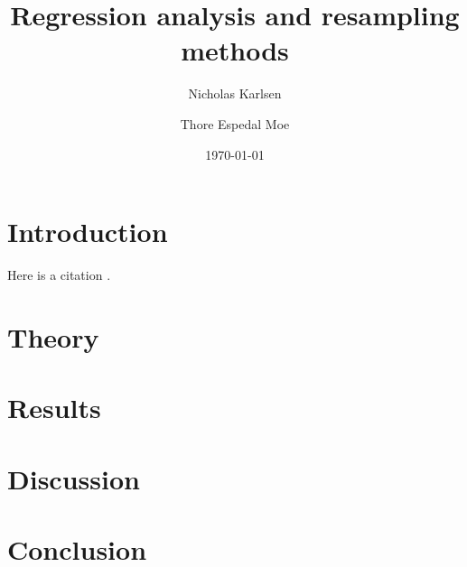 \documentclass[reprint, english, nofootinbib]{revtex4-2}
\begin{document}
\title{Regression analysis and resampling methods}
\author{Nicholas Karlsen}
\author{Thore Espedal Moe}
\date{\today}

\begin{abstract}
    \blindtext
\end{abstract}

\maketitle

\section{Introduction}
    Here is a citation \textcite{hastie}.
    \blindtext
\section{Theory}
    \blindtext
\section{Results}
    \blindtext
\section{Discussion}
    \blindtext
\section{Conclusion}
    \blindtext

\onecolumngrid

\newpage
\twocolumngrid
\appendix
\end{document}
